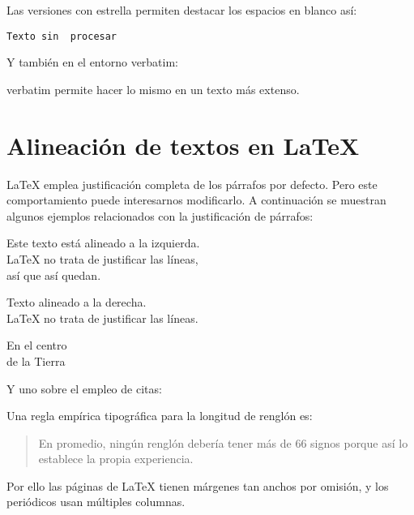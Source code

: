 Las versiones con estrella permiten destacar los espacios en blanco así:

\verb*|Texto sin  procesar|

Y también en el entorno verbatim:

\begin{verbatim*}
   verbatim permite hacer lo 
   mismo en un texto más extenso.
\end{verbatim*} 



\section{Alineación de textos en \LaTeX{}}
\label{sec:alinea} %

\LaTeX{} emplea justificación completa de los párrafos por defecto. Pero este comportamiento puede interesarnos modificarlo. A continuación se muestran algunos ejemplos relacionados con la justificación de párrafos:

\begin{flushleft}
	Este texto está alineado a la izquierda. \\
	\LaTeX{} no trata de justificar las líneas, \\
	así que así quedan.
\end{flushleft}

\begin{flushright}
	Texto alineado a la derecha. \\
	\LaTeX{} no trata de justificar las líneas.
\end{flushright}

\begin{center}
	En el centro\\
	de la Tierra
\end{center}

\noindent Y uno sobre el empleo de citas:

Una regla empírica tipográfica para la longitud de renglón es:

\begin{quote}
	En promedio, ningún renglón debería tener más de 66 signos porque así lo establece la propia experiencia.
\end{quote}

Por ello las páginas de \LaTeX{} tienen márgenes tan anchos por omisión, y los periódicos usan múltiples columnas. 

